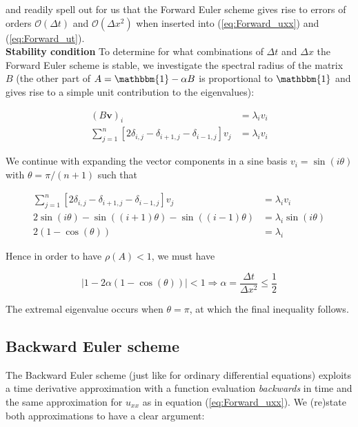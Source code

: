 \documentclass[a4paper, 11pt, notitlepage,english]{article}
\newcommand{\id}{\mathbbm{1}}
\begin{document}
and readily spell out for us that the Forward Euler scheme gives rise to errors of orders $\mathcal{O}(\Delta t)$ and $\mathcal{O}(\Delta x^2)$ when inserted into (\ref{eq:Forward_uxx}) and (\ref{eq:Forward_ut}). \\


\textbf{Stability condition} \newline
To determine for what combinations of $\Delta t$ and $\Delta x$ the Forward Euler scheme is stable, we investigate the spectral radius of the matrix $B$ (the other part of $A = \id - \alpha B$ is proportional to $\id$ and gives rise to a simple unit contribution to the eigenvalues):

\begin{align}
(B\boldsymbol{v})_i &= \lambda_i v_i \\
\sum_{j=1}^n [2\delta_{i,j}-\delta_{i+1,j}-\delta_{i-1,j}]v_j &= \lambda_i v_i
\label{eq:Forward_Euler_stability1}
\end{align}

We continue with expanding the vector components in a sine basis $v_i = \sin(i\theta)$ with $\theta = \pi/(n+1)$ such that

\begin{align}
\sum_{j=1}^n [2\delta_{i,j}-\delta_{i+1,j}-\delta_{i-1,j}]v_j &= \lambda_i v_i \\
2 \sin(i\theta) - \sin\left((i+1)\theta\right) - \sin\left((i-1)\theta\right) &= \lambda_i \sin(i\theta) \\
2(1-\cos(\theta)) &= \lambda_i
\label{eq:Forward_Euler_stability2}
\end{align}

Hence in order to have $\rho(A) < 1$, we must have

\begin{equation}
\lvert 1-2\alpha(1-\cos(\theta)) \rvert < 1 \Rightarrow \alpha = \frac{\Delta t}{\Delta x^2} \leq \frac{1}{2}
\label{eq:Forward_Euler_stability3}
\end{equation}

The extremal eigenvalue occurs when $\theta = \pi$, at which the final inequality follows.

\subsection{Backward Euler scheme}
The Backward Euler scheme (just like for ordinary differential equations) exploits a time derivative approximation with a function evaluation \emph{backwards} in time and the same approximation for $u_{xx}$ as in equation (\ref{eq:Forward_uxx}). We (re)state both approximations to have a clear argument:
\end{document}
